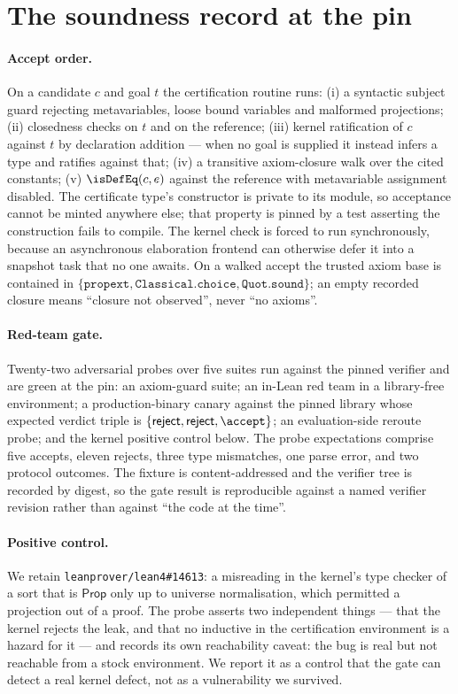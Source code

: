 \section{The soundness record at the pin}
\label{app:soundness}

\paragraph{Accept order.}
On a candidate \(c\) and goal \(t\) the certification routine runs:
(i) a syntactic subject guard rejecting metavariables, loose bound variables and
malformed projections;
(ii) closedness checks on \(t\) and on the reference;
(iii) kernel ratification of \(c\) against \(t\) by declaration addition ---
when no goal is supplied it instead infers a type and ratifies against that;
(iv) a transitive axiom-closure walk over the cited constants;
(v) \(\isDefEq(c, e)\) against the reference with metavariable assignment
disabled.
The certificate type's constructor is private to its module, so acceptance
cannot be minted anywhere else;
that property is pinned by a test asserting the construction fails to compile.
The kernel check is forced to run synchronously, because an asynchronous
elaboration frontend can otherwise defer it into a snapshot task that no one
awaits.
On a walked accept the trusted axiom base is contained in
\(\{\texttt{propext}, \texttt{Classical.choice}, \texttt{Quot.sound}\}\);
an empty recorded closure means ``closure not observed'', never ``no axioms''.

\paragraph{Red-team gate.}
Twenty-two adversarial probes over five suites run against the pinned verifier
and are green at the pin:
an axiom-guard suite; an in-Lean red team in a library-free environment;
a production-binary canary against the pinned library whose expected verdict
triple is \(\{\textsf{reject}, \textsf{reject}, \accept\}\);
an evaluation-side reroute probe;
and the kernel positive control below.
The probe expectations comprise five accepts, eleven rejects, three type
mismatches, one parse error, and two protocol outcomes.
The fixture is content-addressed and the verifier tree is recorded by digest, so
the gate result is reproducible against a named verifier revision rather than
against ``the code at the time''.

\paragraph{Positive control.}
We retain \texttt{leanprover/lean4\#14613}:
a misreading in the kernel's type checker of a sort that is \(\mathsf{Prop}\)
only up to universe normalisation, which permitted a projection out of a proof.
The probe asserts two independent things --- that the kernel rejects the leak,
and that no inductive in the certification environment is a hazard for it --- and
records its own reachability caveat:
the bug is real but not reachable from a stock environment.
We report it as a control that the gate can detect a real kernel defect, not as
a vulnerability we survived.

